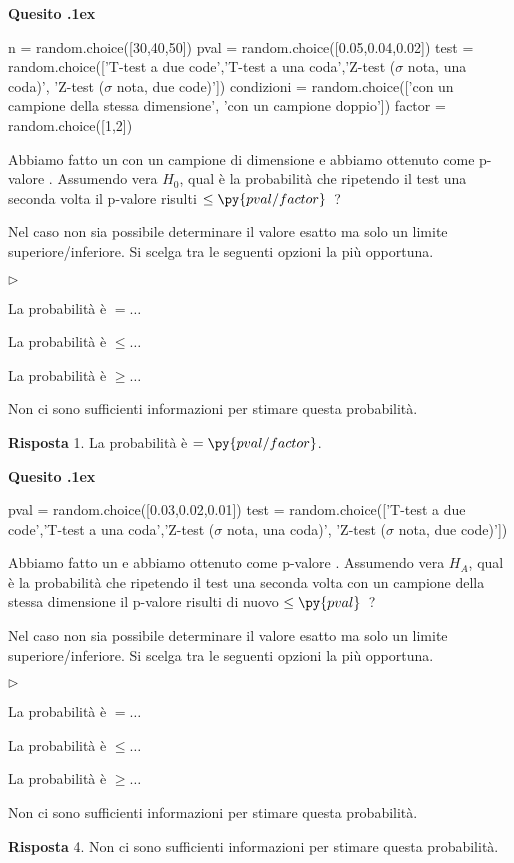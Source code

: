 \documentclass[11pt,twoside,a4paper]{article}
\newcommand{\mylabel}[1]{#1\hfill}
\renewenvironment{itemize}
  {\begin{list}{$\triangleright$}{%
   \setlength{\parskip}{0mm}
   \setlength{\topsep}{.4\baselineskip}
   \setlength{\rightmargin}{0mm}
   \setlength{\listparindent}{0mm}
   \setlength{\itemindent}{0mm}
   \setlength{\labelwidth}{2ex}
   \setlength{\itemsep}{.4\baselineskip}
   \setlength{\parsep}{0mm}
   \setlength{\partopsep}{0mm}
   \setlength{\labelsep}{1ex}
   \setlength{\leftmargin}{\labelwidth+\labelsep}
   \let\makelabel\mylabel}}{%
   \end{list}\vspace*{-1.3mm}}
\newcounter{quesito}
\newenvironment{question}{\bigskip\addtocounter{quesito}{1}\par\textbf{Quesito \thequesito.\kern1ex}}{\vspace{\parskip}}
\newenvironment{answer}{\par\textbf{Risposta\quad}}{\vspace{\parskip}}
\begin{document}
\begin{question}
\begin{pycode}
n = random.choice([30,40,50])
pval = random.choice([0.05,0.04,0.02])
test = random.choice(['T-test a due code','T-test a una coda','Z-test ($\sigma$ nota, una coda)', 'Z-test ($\sigma$ nota, due code)'])
condizioni  = random.choice(['con un campione della stessa dimensione', 'con un campione doppio'])
factor =  random.choice([1,2])
\end{pycode}
Abbiamo fatto un  con un campione di dimensione  e abbiamo ottenuto come p-valore .
Assumendo vera $H_0$, qual è la probabilità che ripetendo il test una seconda volta  il p-valore risulti $\le\py{pval/factor}$~?

Nel caso non sia possibile determinare il valore esatto ma solo un limite superiore/inferiore. Si scelga tra le seguenti opzioni la più opportuna.
\begin{itemize}
\item[1.] La probabilità è $=\dots$
\item[2.] La probabilità è $\le\dots$
\item[3.] La probabilità è $\ge\dots$
\item[4.] Non ci sono sufficienti informazioni per stimare questa probabilità.
\end{itemize}
\begin{answer}
{\color{blue}1. La probabilità è $=\py{pval/factor}$.}
\end{answer}
\end{question}


\begin{question}
\begin{pycode}
pval = random.choice([0.03,0.02,0.01])
test = random.choice(['T-test a due code','T-test a una coda','Z-test ($\sigma$ nota, una coda)', 'Z-test ($\sigma$ nota, due code)'])
\end{pycode}
Abbiamo fatto un  e abbiamo ottenuto come p-valore .
Assumendo vera $H_A$, qual è la probabilità che ripetendo il test una seconda volta con un campione della stessa dimensione il p-valore risulti di nuovo $\le\py{pval}$~?

Nel caso non sia possibile determinare il valore esatto ma solo un limite superiore/inferiore. Si scelga tra le seguenti opzioni la più opportuna.
\begin{itemize}
\item[1.] La probabilità è $=\dots$
\item[2.] La probabilità è $\le\dots$
\item[3.] La probabilità è $\ge\dots$
\item[4.] Non ci sono sufficienti informazioni per stimare questa probabilità.
\end{itemize}
\begin{answer}
{\color{blue}4. Non ci sono sufficienti informazioni per stimare questa probabilità.}
\end{answer}
\end{question}
\end{document}
